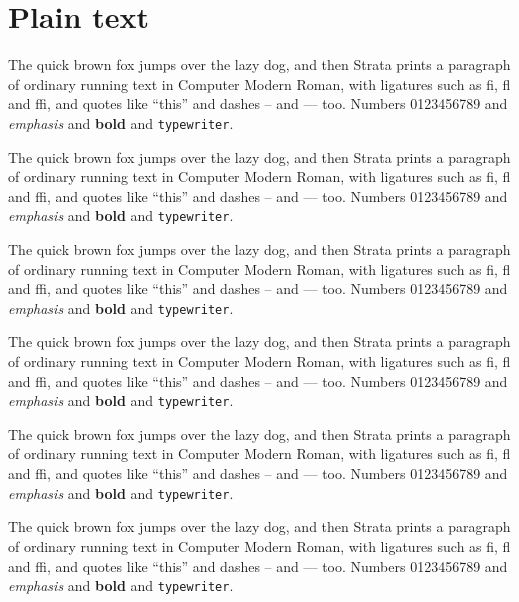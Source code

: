 \documentclass{article}
\begin{document}
\section{Plain text}
The quick brown fox jumps over the lazy dog, and then Strata prints a
paragraph of ordinary running text in Computer Modern Roman, with ligatures
such as fi, fl and ffi, and quotes like ``this'' and dashes -- and --- too.
Numbers 0123456789 and \emph{emphasis} and \textbf{bold} and
\texttt{typewriter}.

The quick brown fox jumps over the lazy dog, and then Strata prints a
paragraph of ordinary running text in Computer Modern Roman, with ligatures
such as fi, fl and ffi, and quotes like ``this'' and dashes -- and --- too.
Numbers 0123456789 and \emph{emphasis} and \textbf{bold} and
\texttt{typewriter}.

The quick brown fox jumps over the lazy dog, and then Strata prints a
paragraph of ordinary running text in Computer Modern Roman, with ligatures
such as fi, fl and ffi, and quotes like ``this'' and dashes -- and --- too.
Numbers 0123456789 and \emph{emphasis} and \textbf{bold} and
\texttt{typewriter}.

The quick brown fox jumps over the lazy dog, and then Strata prints a
paragraph of ordinary running text in Computer Modern Roman, with ligatures
such as fi, fl and ffi, and quotes like ``this'' and dashes -- and --- too.
Numbers 0123456789 and \emph{emphasis} and \textbf{bold} and
\texttt{typewriter}.

The quick brown fox jumps over the lazy dog, and then Strata prints a
paragraph of ordinary running text in Computer Modern Roman, with ligatures
such as fi, fl and ffi, and quotes like ``this'' and dashes -- and --- too.
Numbers 0123456789 and \emph{emphasis} and \textbf{bold} and
\texttt{typewriter}.

The quick brown fox jumps over the lazy dog, and then Strata prints a
paragraph of ordinary running text in Computer Modern Roman, with ligatures
such as fi, fl and ffi, and quotes like ``this'' and dashes -- and --- too.
Numbers 0123456789 and \emph{emphasis} and \textbf{bold} and
\texttt{typewriter}.
\end{document}

